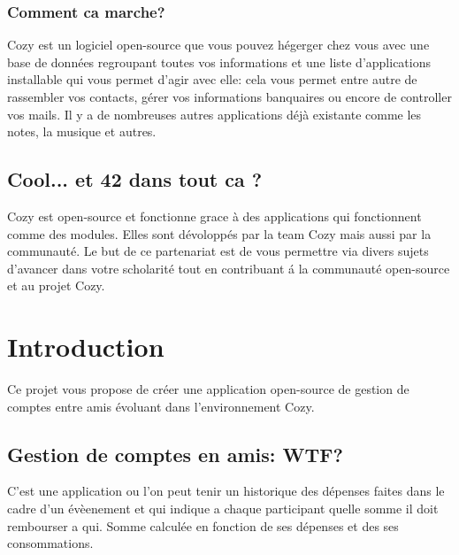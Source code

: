 \documentclass{42-fr}
\begin{document}
		\subsection{Comment ca marche?}

			Cozy est un logiciel open-source que vous pouvez h\'egerger chez vous
			avec une base de donn\'ees regroupant toutes vos informations et une liste
			d'applications installable qui vous permet d'agir avec elle: cela vous
			permet entre autre de rassembler vos contacts, g\'erer vos
			informations banquaires ou encore de controller vos mails. Il y a de
			nombreuses autres applications d\'ej\`a existante comme les notes,
			la musique et autres.

	\section{Cool... et 42 dans tout ca ?}

		Cozy est open-source et fonctionne grace \`a des applications qui
		fonctionnent comme des modules. Elles sont d\'evolopp\'es par la
		team Cozy mais aussi par la communaut\'e. Le but de ce partenariat est
		de vous permettre via divers sujets d'avancer dans votre scholarit\'e
		tout en contribuant \'a la communaut\'e open-source et au projet Cozy.


\chapter{Introduction}

	Ce projet vous propose de cr\'eer une application open-source de gestion de
	comptes entre amis \'evoluant dans l'environnement Cozy.

	\section{Gestion de comptes en amis: WTF?}

		C'est une application ou l'on peut tenir un historique des d\'epenses faites
		dans le cadre d'un \'ev\`eenement et qui indique a chaque participant
		quelle somme il doit rembourser a qui. Somme calcul\'ee en fonction
		de ses d\'epenses et des ses consommations.
\end{document}
